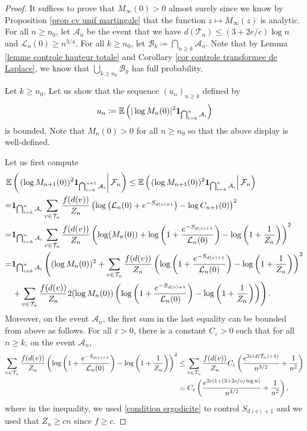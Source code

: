 \documentclass[10pt,a4paper]{amsart}
\def\E{\mathbb{E}}
\def \T{\mathcal{T}}
\def \cL{\mathcal{L}}
\def\vp{\varepsilon}
\begin{document}
\begin{proof}
	It suffices to prove that $M_\infty(0)> 0$ almost surely since we know by Proposition \ref{prop cv unif martingale} that the function $z \mapsto M_\infty(z)$ is analytic. For all $n\ge n_0$, let $\mathcal{A}_n$ be the event that we have $d(\T_n)\le (3+2e/c)\log n$ and $\cL_n(0) \ge n^{3/4}$. For all $k\ge n_0$, let $\mathcal{B}_k \coloneqq \bigcap_{n\ge k} \mathcal{A}_n$. Note that by Lemma \ref{lemme controle hauteur totale} and Corollary \ref{cor controle transformee de Laplace}, we know that $\bigcup_{k\ge n_0}\mathcal{B}_k$ has full probability.
	
	Let $k\ge n_0$. Let us show that the sequence $(u_n)_{n\ge k}$ defined by
	\[
	u_n\coloneqq \E\left(\vert \log M_n(0)\vert^2 {\bf 1}_{\bigcap_{i=k}^n \mathcal{A}_i}\right)
	\]
	is bounded. Note that $M_n(0)>0$ for all $n\ge n_0$ so that the above display is well-defined.
	
	Let us first compute
	\begin{align*}
		\E&\left( \left. (\log M_{n+1}(0))^2{\bf 1}_{\bigcap_{i=k}^{n+1} \mathcal{A}_i} \right\vert \mathcal{F}_n \right)
		\le \E\left( \left. (\log M_{n+1}(0))^2{\bf 1}_{\bigcap_{i=k}^{n} \mathcal{A}_i} \right\vert \mathcal{F}_n \right) \\
		=&{\bf 1}_{\bigcap_{i=k}^{n} \mathcal{A}_i}
		\sum_{v \in \T_n} \frac{f(d(v))}{Z_n} \left( \log\left(\cL_n(0)+ e^{-S_{d(v)+1}}\right) -\log C_{n+1}(0)\right)^2\\
		=&{\bf 1}_{\bigcap_{i=k}^{n} \mathcal{A}_i}\sum_{v \in \T_n} \frac{f(d(v))}{Z_n} \left(\log(M_n(0)) + \log \left(1+ \frac{e^{-S_{d(v)+1}} }{\cL_n(0)}\right) -\log\left(1+\frac{1}{Z_n}\right)\right)^2\\
		=&{\bf 1}_{\bigcap_{i=k}^{n} \mathcal{A}_i} \left( (\log M_n(0))^2 + \sum_{v \in \T_n} \frac{f(d(v))}{Z_n} \left(\log \left(1+ \frac{e^{-S_{d(v)+1}} }{\cL_n(0)}\right) -\log\left(1+\frac{1}{Z_n}\right)\right)^2 \right. \\
		&\left.+ \sum_{v \in \T_n} \frac{f(d(v))}{Z_n}2(\log M_n(0))\left(\log \left(1+ \frac{e^{-S_{d(v)+1}} }{\cL_n(0)}\right) -\log\left(1+\frac{1}{Z_n}\right)\right)  \right).
	\end{align*}
	Moreover, on the event $\mathcal{A}_n$, the first sum in the last equality can be bounded from above as follows. For all $\vp>0$, there is a constant $C_\vp>0$ such that for all $n\ge k$, on the event $\mathcal{A}_n$,
	\begin{align}
		\sum_{v \in \T_n} \frac{f(d(v))}{Z_n} \left(\log \left(1+ \frac{e^{-S_{d(v)+1}} }{\cL_n(0)}\right) -\log\left(1+\frac{1}{Z_n}\right)\right)^2&\le
		\sum_{v \in \T_n} \frac{f(d(v))}{Z_n}C_\vp \left( \frac{e^{2\vp (d(\T_n)+1)}}{n^{3/2}} + \frac{1}{n^2} \right) \notag \\
		&= C_\vp \left( \frac{e^{2\vp (1+(3+2e/c)\log n)}}{n^{3/2}} + \frac{1}{n^2} \right), \label{eq premiere somme}
	\end{align}
	where in the inequality, we used \eqref{condition ergodicite} to control $S_{d(v)+1}$ and we used that $Z_n \ge cn$ since $f\ge c$.
	

\end{proof}
\end{document}
